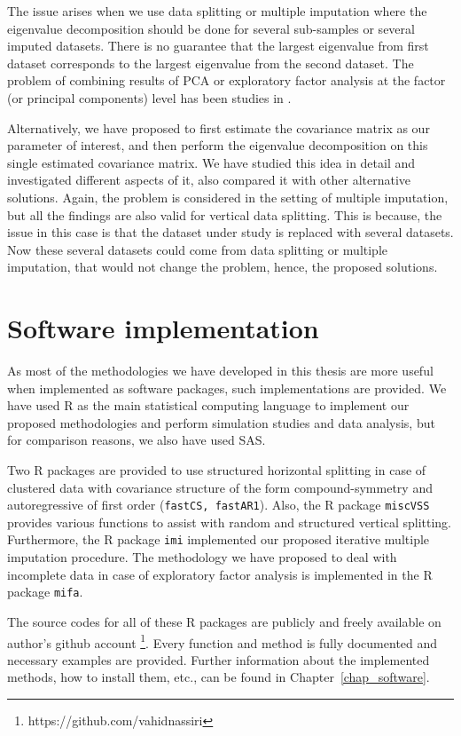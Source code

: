 \documentclass[11pt,a5paper,twoside]{book}
\let\rmarkdownfootnote\footnote%
\def\footnote{\protect\rmarkdownfootnote}
\begin{document}
The issue arises when we use data splitting or multiple imputation where the eigenvalue decomposition should be done for several sub-samples or several imputed datasets. There is no guarantee that the largest eigenvalue from first dataset corresponds to the largest eigenvalue from the second dataset. The problem of combining results of PCA or exploratory factor analysis at the factor (or principal components) level has been studies in \cite{lovik2017combining}. 

Alternatively, we have proposed to first estimate the covariance matrix as our parameter of interest, and then perform the eigenvalue decomposition on this single estimated covariance matrix. We have studied this idea in detail and investigated different aspects of it, also compared it with other alternative solutions. Again, the problem is considered in the setting of multiple imputation, but all the findings are also valid for vertical data splitting. This is because, the issue in this case is that the dataset under study is replaced with several datasets. Now these several datasets could come from data splitting or multiple imputation, that would not change the problem, hence, the proposed solutions.




\section{Software implementation}

As most of the methodologies we have developed in this thesis are more useful when implemented as software packages, such implementations are provided. We have used R as the main statistical computing language to implement our proposed methodologies and perform simulation studies and data analysis, but for comparison reasons, we also have used SAS. 

Two R packages are provided to use structured horizontal splitting in case of clustered data with covariance structure of the form compound-symmetry and autoregressive of first order ({\tt{fastCS, fastAR1}}). Also, the R package {\tt{miscVSS}} provides various functions to assist with random and structured vertical splitting. Furthermore, the R package {\tt{imi}} implemented our proposed iterative multiple imputation procedure. The methodology we have proposed to deal with incomplete data in case of exploratory factor analysis is implemented in the R package {\tt{mifa}}. 

The source codes for all of these R packages are publicly and freely available on author's github account \footnote{https://github.com/vahidnassiri}. Every function and method is fully documented and necessary examples are provided. Further information about the implemented methods, how to install them, etc., can be found in Chapter~\ref{chap_software}.
\end{document}
